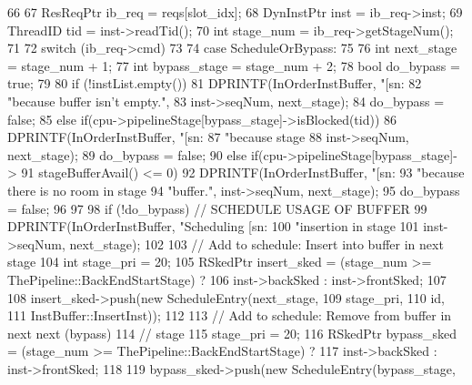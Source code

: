 \begin{DoxyCode}
66 {
67     ResReqPtr ib_req = reqs[slot_idx];
68     DynInstPtr inst = ib_req->inst;
69     ThreadID tid = inst->readTid();
70     int stage_num = ib_req->getStageNum();
71 
72     switch (ib_req->cmd)
73     {
74       case ScheduleOrBypass:
75         {
76             int next_stage = stage_num + 1;
77             int bypass_stage = stage_num + 2;
78             bool do_bypass = true;
79 
80             if (!instList.empty()) {
81                 DPRINTF(InOrderInstBuffer, "[sn:%
82                         "because buffer isn't empty.\n",
83                         inst->seqNum, next_stage);
84                 do_bypass = false;
85             } else if(cpu->pipelineStage[bypass_stage]->isBlocked(tid)) {
86                 DPRINTF(InOrderInstBuffer, "[sn:%
87                         "because stage %
88                         inst->seqNum, next_stage);
89                 do_bypass = false;
90             } else if(cpu->pipelineStage[bypass_stage]->
91                       stageBufferAvail() <= 0) {
92                 DPRINTF(InOrderInstBuffer, "[sn:%
93                         "because there is no room in stage %
94                         "buffer.\n", inst->seqNum, next_stage);
95                 do_bypass = false;
96             }
97 
98             if (!do_bypass) { // SCHEDULE USAGE OF BUFFER
99                 DPRINTF(InOrderInstBuffer, "Scheduling [sn:%
100                         "insertion in stage %
101                         inst->seqNum, next_stage);
102 
103                 // Add to schedule: Insert into buffer in next stage
104                 int stage_pri = 20;
105                 RSkedPtr insert_sked = (stage_num >= 
      ThePipeline::BackEndStartStage) ?
106                     inst->backSked : inst->frontSked;
107 
108                 insert_sked->push(new ScheduleEntry(next_stage,
109                                                       stage_pri,
110                                                       id,
111                                                       InstBuffer::InsertInst));
112 
113                 // Add to schedule: Remove from buffer in next next (bypass)
114                 // stage
115                 stage_pri = 20;
116                 RSkedPtr bypass_sked = (stage_num >= 
      ThePipeline::BackEndStartStage) ?
117                     inst->backSked : inst->frontSked;
118 
119                bypass_sked->push(new ScheduleEntry(bypass_stage,
}}}}
\end{DoxyCode}

